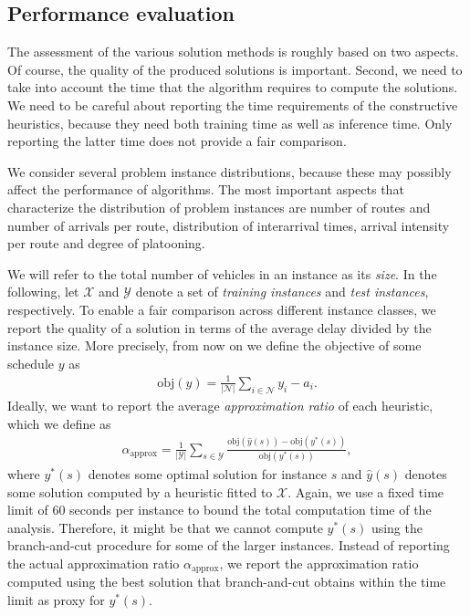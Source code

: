 \documentclass[a4paper]{article}
\theoremstyle{definition}
\theoremstyle{plain}
\begin{document}
\subsection{Performance evaluation}

The assessment of the various solution methods is roughly based on two
aspects. Of course, the quality of the produced solutions is important. Second,
we need to take into account the time that the algorithm requires to compute the
solutions. We need to be careful about reporting the time requirements of the
constructive heuristics, because they need both training time as well as
inference time. Only reporting the latter time does not provide a fair
comparison.

We consider several problem instance distributions, because these may possibly
affect the performance of algorithms. The most important aspects that
characterize the distribution of problem instances are number of routes and
number of arrivals per route, distribution of interarrival times, arrival
intensity per route and degree of platooning.

We will refer to the total number of vehicles in an instance as its \textit{size}.
%
In the following, let $\mathcal{X}$ and $\mathcal{Y}$ denote a set of \textit{training instances}
and \textit{test instances}, respectively.
%
To enable a fair comparison across different instance classes, we report the
quality of a solution in terms of the average delay divided by the
instance size. More precisely, from now on we define the objective of some schedule $y$ as
\begin{align*}
  \textrm{obj}(y) = \frac{1}{|\mathcal{N}|} \sum_{i \in \mathcal{N}} y_{i} - a_{i} .
\end{align*}
%
Ideally, we want to report the average \textit{approximation ratio} of each
heuristic, which we define as
\begin{align*}
  \alpha_{\text{approx}} = \frac{1}{|\mathcal{Y}|} \sum_{s \in \mathcal{Y}} \frac{\textrm{obj}(\hat{y}(s)) - \textrm{obj}(y^{*}(s))}{\textrm{obj}(y^{*}(s))} ,
\end{align*}
where $y^{*}(s)$ denotes some optimal solution for instance $s$ and $\hat{y}(s)$
denotes some solution computed by a heuristic fitted to $\mathcal{X}$.
%
Again, we use a fixed time limit of 60 seconds per instance to bound the total
computation time of the analysis. Therefore, it might be that we cannot compute $y^{*}(s)$ using
the branch-and-cut procedure for some of the larger instances.
%
Instead of reporting the actual approximation ratio $\alpha_{\text{approx}}$, we
report the approximation ratio computed using the best solution that
branch-and-cut obtains within the time limit as proxy for $y^{*}(s)$.
\end{document}
